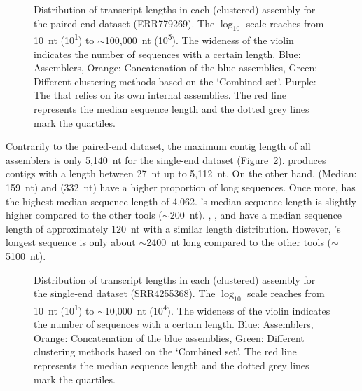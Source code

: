 \documentclass[12pt,a4paper,english]{article}
\begin{document}
\begin{figure}[H]
	\centering
	\def\svgwidth{\textwidth}
	
	\caption[Distribution of transcript lengths per assembly (PE, ERR779269)]{Distribution of transcript lengths in each (clustered) assembly for the paired-end \ecoli dataset (ERR779269). The $\log_{10}$ scale reaches from 10~nt (10\textsuperscript{1}) to $\sim$100,000~nt (10\textsuperscript{5}). The wideness of the violin indicates the number of sequences with a certain length. Blue: Assemblers, Orange: Concatenation of the blue assemblies, Green: Different clustering methods based on the `Combined set'. Purple: The \orp that relies on its own internal assemblies. The red line represents the median sequence length and the dotted grey lines mark the quartiles.}
	\label{img:violin:eco_ERR779269}
\end{figure}

    Contrarily to the paired-end dataset, the maximum contig length of all assemblers is only 5,140~nt for the single-end dataset (Figure~\ref{img:violin:eco_SRR4255368}).
	\soap produces contigs with a length between 27~nt up to 5,112~nt. On the other hand, \spades (Median: 159~nt) and \trinity (332~nt) have a higher proportion of long sequences.
	Once more, \grouper has the highest median sequence length of 4,062. \karma's median sequence length is slightly higher compared to the other tools ($\sim$200~nt). \cdhit, \linclust, \mclust and \mclusttwo have a median sequence length of approximately 120~nt with a similar length distribution. However, \mclust's longest sequence is only about $\sim$2400~nt long compared to the other tools ($\sim$5100~nt).

	\begin{figure}[H]
		\centering
		\def\svgwidth{\textwidth}
		
		\caption[Distribution of transcript lengths per assembly (SE, SRR4255368)]{Distribution of transcript lengths in each (clustered) assembly for the single-end \ecoli dataset (SRR4255368). The $\log_{10}$ scale reaches from 10~nt (10\textsuperscript{1}) to $\sim$10,000~nt (10\textsuperscript{4}). The wideness of the violin indicates the number of sequences with a certain length. Blue: Assemblers, Orange: Concatenation of the blue assemblies, Green: Different clustering methods based on the `Combined set'. The red line represents the median sequence length and the dotted grey lines mark the quartiles.}
		\label{img:violin:eco_SRR4255368}
	\end{figure}
\end{document}
